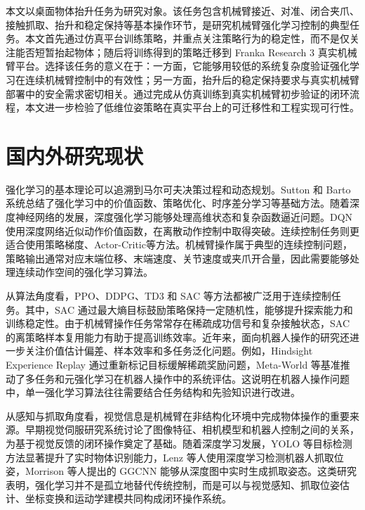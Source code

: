 \documentclass[
    type = bachelor,
    oneside,
    fontset = fandol
]{njuthesis}
\begin{document}
本文以桌面物体抬升任务为研究对象。该任务包含机械臂接近、对准、闭合夹爪、接触抓取、抬升和稳定保持等基本操作环节，是研究机械臂强化学习控制的典型任务。本文首先通过仿真平台训练策略，并重点关注策略行为的稳定性，而不是仅关注能否短暂抬起物体；随后将训练得到的策略迁移到 Franka Research 3 真实机械臂平台。选择该任务的意义在于：一方面，它能够用较低的系统复杂度验证强化学习在连续机械臂控制中的有效性；另一方面，抬升后的稳定保持要求与真实机械臂部署中的安全需求密切相关。通过完成从仿真训练到真实机械臂初步验证的闭环流程，本文进一步检验了低维位姿策略在真实平台上的可迁移性和工程实现可行性。

\section{国内外研究现状}

强化学习的基本理论可以追溯到马尔可夫决策过程和动态规划。Sutton 和 Barto 系统总结了强化学习中的价值函数、策略优化、时序差分学习等基础方法\cite{sutton2018reinforcement}。随着深度神经网络的发展，深度强化学习能够处理高维状态和复杂函数逼近问题。DQN 使用深度网络近似动作价值函数，在离散动作控制中取得突破\cite{mnih2015human}。连续控制任务则更适合使用策略梯度、Actor-Critic等方法。机械臂操作属于典型的连续控制问题，策略输出通常对应末端位移、末端速度、关节速度或夹爪开合量，因此需要能够处理连续动作空间的强化学习算法。

从算法角度看，PPO\cite{schulman2017ppo}、DDPG\cite{lillicrap2015ddpg}、TD3 和 SAC 等方法都被广泛用于连续控制任务。其中，SAC 通过最大熵目标鼓励策略保持一定随机性，能够提升探索能力和训练稳定性\cite{haarnoja2018sac}。由于机械臂操作任务常常存在稀疏成功信号和复杂接触状态，SAC 的离策略样本复用能力有助于提高训练效率。近年来，面向机器人操作的研究还进一步关注价值估计偏差、样本效率和多任务泛化问题。例如，Hindsight Experience Replay 通过重新标记目标缓解稀疏奖励问题\cite{andrychowicz2017hindsight}，Meta-World 等基准推动了多任务和元强化学习在机器人操作中的系统评估\cite{yu2020metaworld}。这说明在机器人操作问题中，单一强化学习算法往往需要结合任务结构和先验知识进行改进。

从感知与抓取角度看，视觉信息是机械臂在非结构化环境中完成物体操作的重要来源。早期视觉伺服研究系统讨论了图像特征、相机模型和机器人控制之间的关系，为基于视觉反馈的闭环操作奠定了基础\cite{hutchinson1996visualservo,chaumette2006visualservo}。随着深度学习发展，YOLO 等目标检测方法显著提升了实时物体识别能力\cite{redmon2016yolo}，Lenz 等人使用深度学习检测机器人抓取位姿\cite{lenz2015deep}，Morrison 等人提出的 GGCNN 能够从深度图中实时生成抓取姿态\cite{morrison2018closing}。这类研究表明，强化学习并不是孤立地替代传统控制，而是可以与视觉感知、抓取位姿估计、坐标变换和运动学建模共同构成闭环操作系统。
\end{document}
